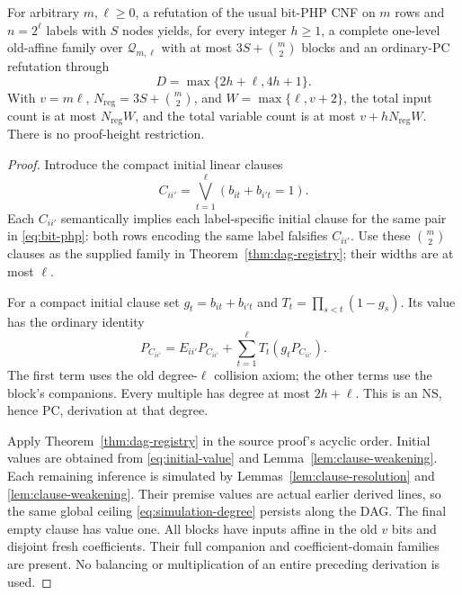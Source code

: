 \begin{theorem}\label{thm:clause-transfer}
For arbitrary \(m,\ell\ge0\), a refutation of the usual bit-PHP CNF
on \(m\) rows and \(n=2^\ell\) labels with \(S\) nodes yields, for every
integer \(h\ge1\), a complete one-level old-affine family over
\(\mathcal Q_{m,\ell}\) with at most \(3S+\binom m2\) blocks and an ordinary-PC
refutation through
\begin{equation}\label{eq:simulation-degree}
 D=\max\{2h+\ell,4h+1\}.
\end{equation}
With \(v=m\ell\), \(N_{\mathrm{reg}}=3S+\binom m2\), and
\(W=\max\{\ell,v+2\}\), the total input count is at most \(N_{\mathrm{reg}}W\),
and the total variable count is at most \(v+hN_{\mathrm{reg}}W\). There is no proof-height restriction.
\end{theorem}
\begin{proof}
 Introduce the compact initial linear clauses
\[
 C_{ii'}=\bigvee_{t=1}^\ell(b_{it}+b_{i't}=1).
\]
Each \(C_{ii'}\) semantically implies each label-specific initial clause
for the same pair in \eqref{eq:bit-php}: both rows encoding the same
label falsifies \(C_{ii'}\).
Use these \(\binom m2\) clauses as the supplied family in
Theorem~\ref{thm:dag-registry}; their widths are at most \(\ell\).

For a compact initial clause set \(g_t=b_{it}+b_{i't}\) and
\(T_t=\prod_{s<t}(1-g_s)\).
Its value has the ordinary identity
\begin{equation}\label{eq:initial-value}
 P_{C_{ii'}}=E_{ii'}P_{C_{ii'}}
                 +\sum_{t=1}^{\ell}T_t(g_tP_{C_{ii'}}).
\end{equation}
The first term uses the old degree-\(\ell\) collision axiom;
the other terms use the block's companions.
Every multiple has degree at most \(2h+\ell\).
This is an NS, hence PC, derivation at that degree.

Apply Theorem~\ref{thm:dag-registry} in the source proof's acyclic order.
Initial values are obtained from \eqref{eq:initial-value} and
Lemma~\ref{lem:clause-weakening}. Each remaining inference is simulated
by Lemmas~\ref{lem:clause-resolution} and \ref{lem:clause-weakening}.
Their premise values are actual earlier derived lines, so the same
global ceiling \eqref{eq:simulation-degree} persists along the DAG.
The final empty clause has value one.
All blocks have inputs affine in the old \(v\) bits and disjoint fresh
coefficients. Their full companion and coefficient-domain families
are present. No balancing or multiplication of an entire preceding
derivation is used.
\end{proof}
